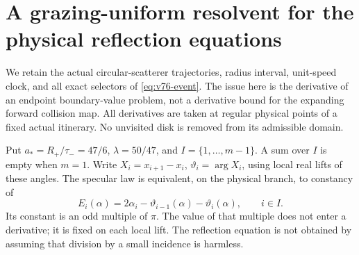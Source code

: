 \section{A grazing-uniform resolvent for the physical reflection equations}
\label{sec:gr-resolvent}
We retain the actual circular-scatterer trajectories, radius interval,
unit-speed clock, and all exact selectors of \eqref{eq:v76-event}.
The issue here is the derivative of an endpoint boundary-value problem,
not a derivative bound for the expanding forward collision map.
All derivatives are taken at regular physical points of a fixed actual
itinerary. No unvisited disk is removed from its admissible domain.

Put $a_*=R_+/\tau_-=47/6$, $\lambda=50/47$, and $I=\{1,\ldots,m-1\}$.
A sum over $I$ is empty when $m=1$. Write
$X_i=x_{i+1}-x_i$, $\vartheta_i=\arg X_i$, using local real lifts of
these angles. The specular law is equivalent, on the physical branch,
to constancy of
\begin{equation}\label{eq:gr-reflection}
 E_i(\alpha)=2\alpha_i-\vartheta_{i-1}(\alpha)-\vartheta_i(\alpha),
 \qquad i\in I.
\end{equation}
Its constant is an odd multiple of $\pi$. The value of that multiple
does not enter a derivative; it is fixed on each local lift.
The reflection equation is not obtained by assuming that division by
a small incidence is harmless.

